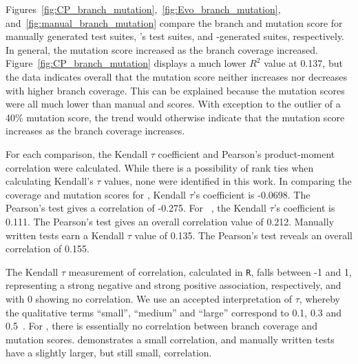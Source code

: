 Figures~\ref{fig:CP_branch_mutation},~\ref{fig:Evo_branch_mutation}, and~\ref{fig:manual_branch_mutation} compare the branch and mutation score for manually generated test suites, \evo's test suites, and \codepro-generated suites, respectively.  In general, the mutation score increased as the branch coverage increased.  Figure~\ref{fig:CP_branch_mutation} displays a much lower $R^2$ value at 0.137, but the data indicates overall that the mutation score neither increases nor decreases with higher branch coverage. This can be explained because the mutation scores were all much lower than manual and \evo scores. With exception to the outlier of a 40\% mutation score, the trend would otherwise indicate that the mutation score increases as the branch coverage increases.

  For each comparison, the Kendall $\tau$ coefficient and Pearson's product-moment correlation were calculated.  While there is a possibility of rank ties when calculating Kendall's $\tau$ values, none were identified in this work.  In comparing the coverage and mutation scores for \codepro, Kendall $\tau$'s coefficient is -0.0698.  The Pearson's test gives a correlation of -0.275. 
For ~\evo, the Kendall $\tau$'s coefficient is 0.111.  The Pearson's test gives an overall correlation value of 0.212.  
Manually written tests earn a Kendall $\tau$ value of 0.135.  The Pearson's test reveals an overall correlation of 0.155.  

The Kendall $\tau$ measurement of correlation, calculated in {\tt R}, falls between -1 and 1, representing a strong negative and strong positive association, respectively, and with 0 showing no correlation. We use an accepted interpretation of $\tau$, whereby the qualitative terms ``small'', ``medium'' and ``large'' correspond to 0.1, 0.3 and 0.5~\cite{kraemer2003}.  For \codepro, there is essentially no correlation between branch coverage and mutation scores.  \evo demonstrates a small correlation, and manually written tests have a slightly larger, but still small, correlation. 

